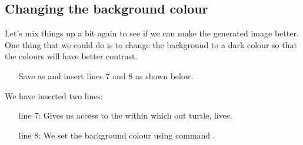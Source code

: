 \documentclass{coderdojo}
\begin{document}
\subsection{Changing the background colour}

Let's mix things up a bit again to see if we can make the generated image better.  One thing that we could do is to change the background to a dark colour so that the colours will have better contrast.

\begin{itemize}
\item[\todoSymbol] \color{todo}
Save  as   and insert lines 7 and 8 as shown below.
\end{itemize}


We have inserted two lines:
\begin{itemize}
\item[{\smaller line 7:}] Gives us access to the  within which out turtle,  lives.
\item[{\smaller line 8:}] We set the background colour using command .
\end{itemize}
\end{document}
